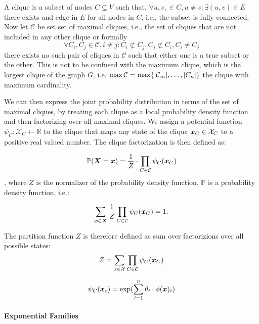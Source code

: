 A clique is a subset of nodes $C \subseteq V$ such that, $\forall u,v,  \in C, u \neq v: \exists (u,v) \in E$ there exists and edge in $E$ for all nodes in $C$, i.e., the subset is fully connected.
Now let $\mathcal{C}$ be set set of maximal cliques, i.e., the set of cliques that are not included in any other clique or formally 
\begin{equation}
    \forall C_i, C_j \in \mathcal{C}, i \neq j  : C_i \not\subset C_j, C_j \not\subset C_i, C_i \neq C_j
\end{equation}
there exists no such pair of cliques in $\mathcal{C}$ such that either one is a true subset or the other.
This is not to be confused with the maximum clique, which is the largest clique of the graph $G$, i.e. $\max \mathcal{C} = \max \{\lvert\mathcal{C_1}\rvert, \ldots, \lvert C_n\rvert\}$ the clique with maximum cardinality.

We can then express the joint probability distribution in terms of the set of maximal cliques, by treating each clique as a local probability density function and then factorizing over all maximal cliques. 
We assign a potential function $\psi_C: \mathcal{X}_C \leftarrow \mathbb{R}$ to the clique that maps any state of the clique $\boldsymbol{x}_C \in \mathcal{X}_C$ to a positive real valued number.
The clique factorization is then defined as:

\begin{equation}
    \mathbb{P}(\boldsymbol{X}=\boldsymbol{x}) = \frac{1}{Z} \cdot \prod_{C \in \mathcal{C}} \psi_C(\boldsymbol{x}_C)
\end{equation},
where $Z$ is the normalizer of the probability density function, $\mathbb{P}$ is a probability density function, i.e.:

\begin{equation}
    \sum_{\boldsymbol{x}\in \mathcal{\boldsymbol{X}}}   \frac{1}{Z} \prod_{C \in \mathcal{C}} \psi_C(\boldsymbol{x}_C)  = 1.
\end{equation}

The partition function $Z$ is therefore defined as sum over factorizions over all possible states:
\begin{equation}
    Z = \sum_{x\in \mathcal{X}} \prod_{C \in \mathcal{C}} \psi_C(\boldsymbol{x}_C)
\end{equation}

\begin{equation}
    \psi_C(\boldsymbol{x}_c) = \exp(\sum_{i=1}^n \theta_i \cdot \phi(\boldsymbol{x})_i)
\end{equation}

\paragraph*{Exponential Families}

